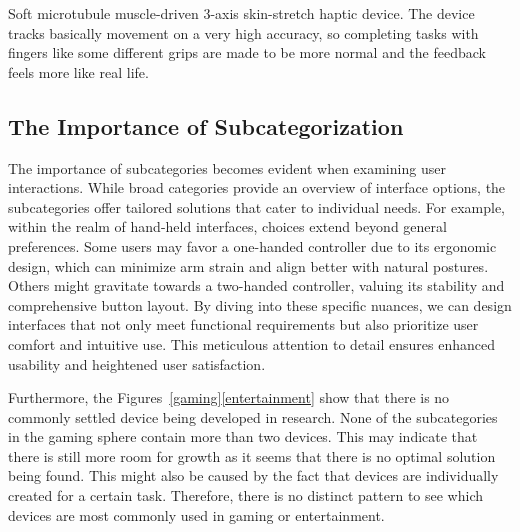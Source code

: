Soft microtubule muscle-driven 3-axis skin-stretch haptic device. The device tracks basically movement on a very high accuracy, so completing tasks with fingers like some different grips are made to be more normal and the feedback feels more like real life.



\subsection{The Importance of Subcategorization}

The importance of subcategories becomes evident when examining user interactions. While broad categories provide an overview of interface options, the subcategories offer tailored solutions that cater to individual needs. For example, within the realm of hand-held interfaces, choices extend beyond general preferences. Some users may favor a one-handed controller due to its ergonomic design, which can minimize arm strain and align better with natural postures. Others might gravitate towards a two-handed controller, valuing its stability and comprehensive button layout. By diving into these specific nuances, we can design interfaces that not only meet functional requirements but also prioritize user comfort and intuitive use. This meticulous attention to detail ensures enhanced usability and heightened user satisfaction. 

Furthermore, the Figures~\ref{gaming}\ref{entertainment} show that there is no commonly settled device being developed in research. None of the subcategories in the gaming sphere contain more than two devices. This may indicate that there is still more room for growth as it seems that there is no optimal solution being found. This might also be caused by the fact that devices are individually created for a certain task. Therefore, there is no distinct pattern to see which devices are most commonly used in gaming or entertainment.